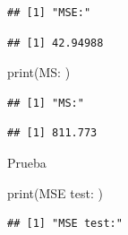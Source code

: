 \documentclass[
]{article}
\newenvironment{Shaded}{\begin{snugshade}}{\end{snugshade}}
\newcommand{\DecValTok}[1]{\textcolor[rgb]{0.00,0.00,0.81}{#1}}
\newcommand{\FunctionTok}[1]{\textcolor[rgb]{0.00,0.00,0.00}{#1}}
\newcommand{\NormalTok}[1]{#1}
\newcommand{\OtherTok}[1]{\textcolor[rgb]{0.56,0.35,0.01}{#1}}
\newcommand{\SpecialCharTok}[1]{\textcolor[rgb]{0.00,0.00,0.00}{#1}}
\newcommand{\StringTok}[1]{\textcolor[rgb]{0.31,0.60,0.02}{#1}}
\begin{document}
\begin{verbatim}
## [1] "MSE:"
\end{verbatim}

\begin{Shaded}
\end{Shaded}

\begin{verbatim}
## [1] 42.94988
\end{verbatim}

\begin{Shaded}
\begin{Highlighting}[]
\FunctionTok{print}\NormalTok{(}\StringTok{\textquotesingle{}MS:\textquotesingle{}}\NormalTok{ )}
\end{Highlighting}
\end{Shaded}

\begin{verbatim}
## [1] "MS:"
\end{verbatim}

\begin{Shaded}
\end{Shaded}

\begin{verbatim}
## [1] 811.773
\end{verbatim}

Prueba

\begin{Shaded}
\begin{Highlighting}[]
\FunctionTok{print}\NormalTok{(}\StringTok{\textquotesingle{}MSE test:\textquotesingle{}}\NormalTok{ )}
\end{Highlighting}
\end{Shaded}

\begin{verbatim}
## [1] "MSE test:"
\end{verbatim}
\end{document}
